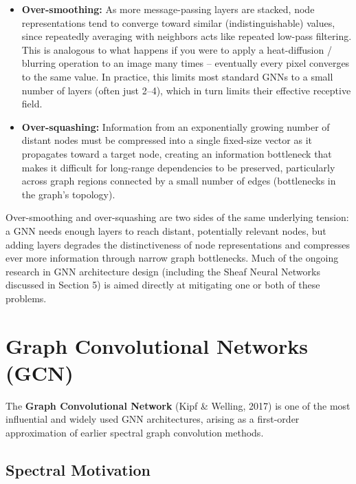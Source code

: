 \documentclass[12pt,a4paper]{article}
\begin{document}
\begin{itemize}[leftmargin=1.5em]
    \item \textbf{Over-smoothing:} As more message-passing layers are stacked, node representations tend to converge toward similar (indistinguishable) values, since repeatedly averaging with neighbors acts like repeated low-pass filtering. This is analogous to what happens if you were to apply a heat-diffusion / blurring operation to an image many times -- eventually every pixel converges to the same value. In practice, this limits most standard GNNs to a small number of layers (often just 2--4), which in turn limits their effective receptive field.
    \item \textbf{Over-squashing:} Information from an exponentially growing number of distant nodes must be compressed into a single fixed-size vector as it propagates toward a target node, creating an information bottleneck that makes it difficult for long-range dependencies to be preserved, particularly across graph regions connected by a small number of edges (bottlenecks in the graph's topology).
\end{itemize}

\begin{keyidea}
Over-smoothing and over-squashing are two sides of the same underlying tension: a GNN needs enough layers to reach distant, potentially relevant nodes, but adding layers degrades the distinctiveness of node representations and compresses ever more information through narrow graph bottlenecks. Much of the ongoing research in GNN architecture design (including the Sheaf Neural Networks discussed in Section 5) is aimed directly at mitigating one or both of these problems.
\end{keyidea}

\newpage

\section{Graph Convolutional Networks (GCN)}

The \textbf{Graph Convolutional Network} (Kipf \& Welling, 2017) is one of the most influential and widely used GNN architectures, arising as a first-order approximation of earlier spectral graph convolution methods.

\subsection{Spectral Motivation}
\end{document}
